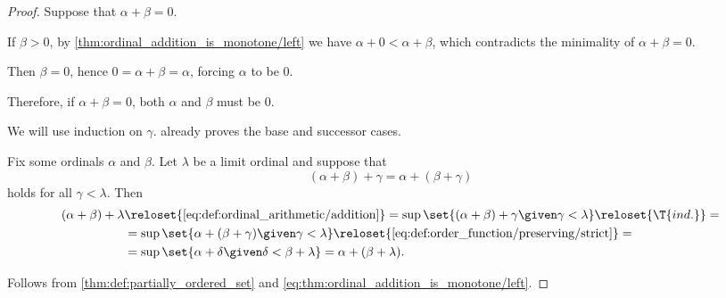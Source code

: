 \begin{proof}
   Suppose that \( \alpha + \beta = 0 \).

  If \( \beta > 0 \), by \cref{thm:ordinal_addition_is_monotone/left} we have \( \alpha + 0 < \alpha + \beta \), which contradicts the minimality of \( \alpha + \beta = 0 \).

  Then \( \beta = 0 \), hence \( 0 = \alpha + \beta = \alpha \), forcing \( \alpha \) to be \( 0 \).

  Therefore, if \( \alpha + \beta = 0 \), both \( \alpha \) and \( \beta \) must be \( 0 \).

   We will use induction on \( \gamma \).  already proves the base and successor cases.

  Fix some ordinals \( \alpha \) and \( \beta \). Let \( \lambda \) be a limit ordinal and suppose that
  \begin{equation*}
    (\alpha + \beta) + \gamma = \alpha + (\beta + \gamma)
  \end{equation*}
  holds for all \( \gamma < \lambda \). Then
  \begin{align*}
    (\alpha + \beta) + \lambda
    &\reloset {\eqref{eq:def:ordinal_arithmetic/addition}} =
    \sup\set{ (\alpha + \beta) + \gamma \given \gamma < \lambda }
    \reloset {\T{ind.}} = \\ &=
    \sup\set{ \alpha + (\beta + \gamma) \given \gamma < \lambda }
    \reloset {\eqref{eq:def:order_function/preserving/strict}} = \\ &=
    \sup\set{ \alpha + \delta \given \delta < \beta + \lambda }
    =
    \alpha + (\beta + \lambda).
  \end{align*}

   Follows from \cref{thm:def:partially_ordered_set} and \eqref{eq:thm:ordinal_addition_is_monotone/left}.
\end{proof}

